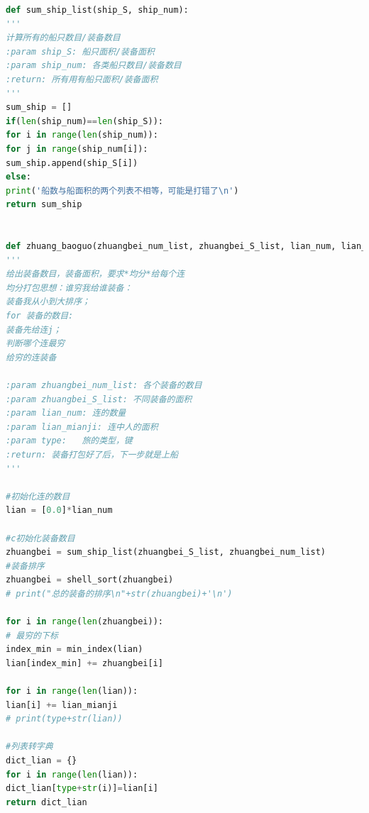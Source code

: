 \documentclass{whutmod}
\begin{document}
\begin{lstlisting}[language=python]
def sum_ship_list(ship_S, ship_num):
'''
计算所有的船只数目/装备数目
:param ship_S: 船只面积/装备面积
:param ship_num: 各类船只数目/装备数目
:return: 所有用有船只面积/装备面积
'''
sum_ship = []
if(len(ship_num)==len(ship_S)):
for i in range(len(ship_num)):
for j in range(ship_num[i]):
sum_ship.append(ship_S[i])
else:
print('船数与船面积的两个列表不相等，可能是打错了\n')
return sum_ship


def zhuang_baoguo(zhuangbei_num_list, zhuangbei_S_list, lian_num, lian_mianji, type):
'''
给出装备数目，装备面积，要求*均分*给每个连
均分打包思想：谁穷我给谁装备：
装备我从小到大排序；
for 装备的数目:
装备先给连j；
判断哪个连最穷
给穷的连装备

:param zhuangbei_num_list: 各个装备的数目
:param zhuangbei_S_list: 不同装备的面积
:param lian_num: 连的数量
:param lian_mianji: 连中人的面积
:param type:   旅的类型，键
:return: 装备打包好了后，下一步就是上船
'''

#初始化连的数目
lian = [0.0]*lian_num

#c初始化装备数目
zhuangbei = sum_ship_list(zhuangbei_S_list, zhuangbei_num_list)
#装备排序
zhuangbei = shell_sort(zhuangbei)
# print("总的装备的排序\n"+str(zhuangbei)+'\n')

for i in range(len(zhuangbei)):
# 最穷的下标
index_min = min_index(lian)
lian[index_min] += zhuangbei[i]

for i in range(len(lian)):
lian[i] += lian_mianji
# print(type+str(lian))

#列表转字典
dict_lian = {}
for i in range(len(lian)):
dict_lian[type+str(i)]=lian[i]
return dict_lian



\end{lstlisting}
\end{document}
